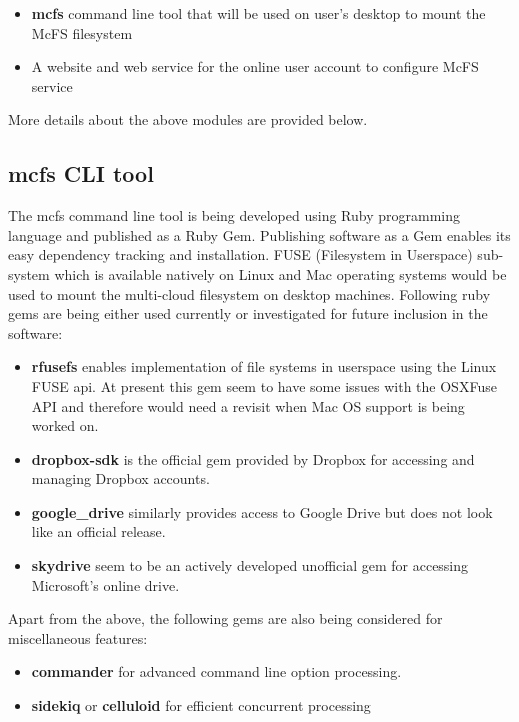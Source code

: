 \begin{itemize}
	\item \textbf{mcfs} command line tool that will be used on user's desktop to mount the McFS filesystem
	\item A website and web service for the online user account to configure McFS service
\end{itemize}

More details about the above modules are provided below.

\subsection{mcfs CLI tool}
The mcfs command line tool is being developed using Ruby programming language and published as a Ruby Gem\cite{site:rubygems}. Publishing software as a Gem enables its easy dependency tracking and installation. FUSE (Filesystem in Userspace)\cite{site:fuselinux} \cite{site:osxfuse} sub-system which is available natively on Linux and Mac operating systems would be used to mount the multi-cloud filesystem on desktop machines. Following ruby gems are being either used currently or investigated for future inclusion in the software:

\begin{itemize}
	\item \textbf{rfusefs} enables implementation of file systems in userspace using the Linux FUSE api. At present this gem seem to have some issues with the OSXFuse API and therefore would need a revisit when Mac OS support is being worked on.
	\item \textbf{dropbox-sdk} is the official gem provided by Dropbox for accessing and managing Dropbox accounts.
	\item \textbf{google\_drive} similarly provides access to Google Drive but does not look like an official release.
	\item \textbf{skydrive} seem to be an actively developed unofficial gem for accessing Microsoft's online drive.
\end{itemize}

Apart from the above, the following gems are also being considered for miscellaneous features:

\begin{itemize}
	\item \textbf{commander} for advanced command line option processing.
	\item \textbf{sidekiq} or \textbf{celluloid} for efficient concurrent processing
\end{itemize}

